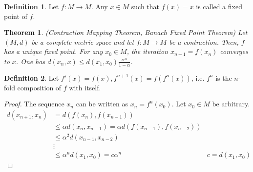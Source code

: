\documentclass{article}
\newtheorem{theorem}{Theorem}[section]
\theoremstyle{definition}
\newtheorem{definition}{Definition}[section]
\begin{document}
    \begin{definition}
        Let $f: M \rightarrow M$. Any $x \in M$ such that $f(x) = x$ is called a fixed point of $f$.
    \end{definition}

    \begin{mdframed}
        \begin{theorem}
            (Contraction Mapping Theorem, Banach Fixed Point Theorem) Let $(M,d)$ be a complete metric space and let 
            $f: M \rightarrow M$ be a contraction. Then, $f$ has a unique fixed point. For any $x_0 \in M$, the iteration $x_{n+1} = f(x_n)$ converges to $x$.
            One has $d(x_n, x) \leq d(x_1, x_0) \frac{\alpha^n}{1-\alpha}$.
        \end{theorem}
    \end{mdframed}
    \begin{definition}
        Let $f'(x) = f(x), f^{n+1}(x) = f(f^n(x))$, i.e. $f^n$ is the $n$-fold composition of $f$ with itself.
    \end{definition}
    \begin{proof}
        The sequence $x_n$ can be written as $x_n = f^n(x_0)$. Let $x_0 \in M$ be arbitrary.
        \begin{align*}
            d(x_{n+1}, x_n) &= d(f(x_n), f(x_{n-1}))\\
            & \leq \alpha d(x_n, x_{n-1}) = \alpha d(f(x_{n-1}), f(x_{n-2}))\\
            & \leq \alpha^2 d(x_{n-1},x_{n-2})\\
            & \vdots\\
            & \leq \alpha^n d(x_1, x_0) = c \alpha^n & c = d(x_1, x_0)
        \end{align*}
    \end{proof}
\end{document}
